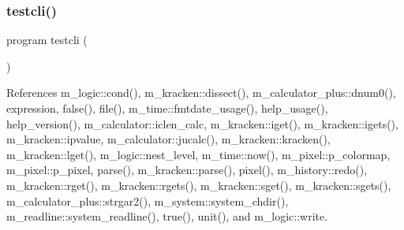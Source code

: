 \mbox{\label{shell_8f90_a19f7365559e8816247241c4721e8eccb}} 
\subsubsection{\texorpdfstring{testcli()}{testcli()}}
{\footnotesize\ttfamily program testcli (\begin{DoxyParamCaption}{ }\end{DoxyParamCaption})}



References m\+\_\+logic\+::cond(), m\+\_\+kracken\+::dissect(), m\+\_\+calculator\+\_\+plus\+::dnum0(), expression, false(), file(), m\+\_\+time\+::fmtdate\+\_\+usage(), help\+\_\+usage(), help\+\_\+version(), m\+\_\+calculator\+::iclen\+\_\+calc, m\+\_\+kracken\+::iget(), m\+\_\+kracken\+::igets(), m\+\_\+kracken\+::ipvalue, m\+\_\+calculator\+::jucalc(), m\+\_\+kracken\+::kracken(), m\+\_\+kracken\+::lget(), m\+\_\+logic\+::nest\+\_\+level, m\+\_\+time\+::now(), m\+\_\+pixel\+::p\+\_\+colormap, m\+\_\+pixel\+::p\+\_\+pixel, parse(), m\+\_\+kracken\+::parse(), pixel(), m\+\_\+history\+::redo(), m\+\_\+kracken\+::rget(), m\+\_\+kracken\+::rgets(), m\+\_\+kracken\+::sget(), m\+\_\+kracken\+::sgets(), m\+\_\+calculator\+\_\+plus\+::strgar2(), m\+\_\+system\+::system\+\_\+chdir(), m\+\_\+readline\+::system\+\_\+readline(), true(), unit(), and m\+\_\+logic\+::write.

